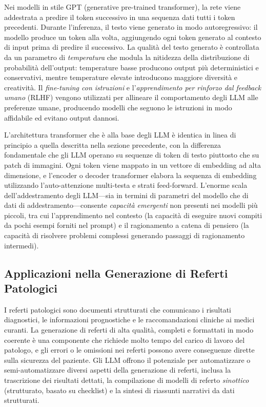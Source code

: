 Nei modelli in stile GPT (generative pre-trained transformer), la rete viene addestrata a predire il token successivo in una sequenza dati tutti i token precedenti. Durante l'inferenza, il testo viene generato in modo autoregressivo: il modello produce un token alla volta, aggiungendo ogni token generato al contesto di input prima di predire il successivo. La qualità del testo generato è controllata da un parametro di \emph{temperatura} che modula la nitidezza della distribuzione di probabilità dell'output: temperature basse producono output più deterministici e conservativi, mentre temperature elevate introducono maggiore diversità e creatività. Il \emph{fine-tuning con istruzioni} e l'\emph{apprendimento per rinforzo dal feedback umano} (RLHF) vengono utilizzati per allineare il comportamento degli LLM alle preferenze umane, producendo modelli che seguono le istruzioni in modo affidabile ed evitano output dannosi.

L'architettura transformer che è alla base degli LLM è identica in linea di principio a quella descritta nella sezione precedente, con la differenza fondamentale che gli LLM operano su sequenze di token di testo piuttosto che su patch di immagini. Ogni token viene mappato in un vettore di embedding ad alta dimensione, e l'encoder o decoder transformer elabora la sequenza di embedding utilizzando l'auto-attenzione multi-testa e strati feed-forward. L'enorme scala dell'addestramento degli LLM---sia in termini di parametri del modello che di dati di addestramento---consente \emph{capacità emergenti} non presenti nei modelli più piccoli, tra cui l'apprendimento nel contesto (la capacità di eseguire nuovi compiti da pochi esempi forniti nel prompt) e il ragionamento a catena di pensiero (la capacità di risolvere problemi complessi generando passaggi di ragionamento intermedi).

\subsection{Applicazioni nella Generazione di Referti Patologici}

I referti patologici sono documenti strutturati che comunicano i risultati diagnostici, le informazioni prognostiche e le raccomandazioni cliniche ai medici curanti. La generazione di referti di alta qualità, completi e formattati in modo coerente è una componente che richiede molto tempo del carico di lavoro del patologo, e gli errori o le omissioni nei referti possono avere conseguenze dirette sulla sicurezza del paziente. Gli LLM offrono il potenziale per automatizzare o semi-automatizzare diversi aspetti della generazione di referti, inclusa la trascrizione dei risultati dettati, la compilazione di modelli di referto \emph{sinottico} (strutturato, basato su checklist) e la sintesi di riassunti narrativi da dati strutturati.

